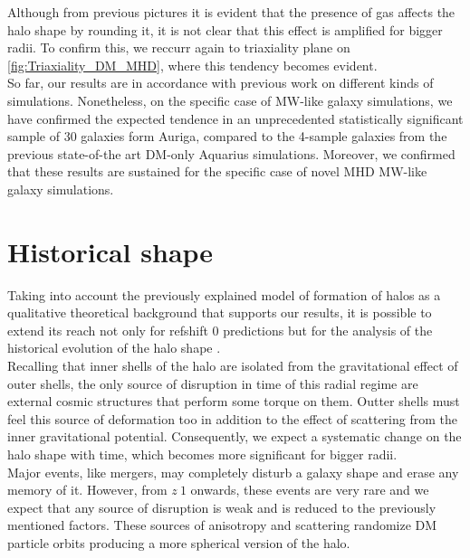 Although from previous pictures it is evident that the presence of gas affects the halo shape by rounding it, it is not clear that this effect is amplified for bigger radii. To confirm this, we reccurr again to triaxiality plane on \ref{fig:Triaxiality_DM_MHD}, where this tendency becomes evident.\\


So far, our results are in accordance with previous work on different kinds of simulations. Nonetheless, on the specific case of MW-like galaxy simulations, we have confirmed the expected tendence in an unprecedented statistically significant sample of 30 galaxies form Auriga, compared to the 4-sample galaxies from the previous state-of-the art DM-only Aquarius simulations. Moreover, we confirmed that these results are sustained for the specific case of novel MHD MW-like galaxy simulations.\\

\section{Historical shape}
Taking into account the previously explained model of formation of halos as a qualitative theoretical background that supports our results, it is possible to extend 
its reach not only for refshift 0 predictions but for the analysis of the historical evolution of the halo shape \cite{}.\\

 Recalling that inner shells of the halo are isolated from the gravitational effect of outer shells, the only source of disruption in time of this radial regime are external cosmic structures that perform some torque on them. Outter shells must feel this source of deformation too in addition to the effect of scattering from the inner gravitational potential. Consequently, we expect a systematic change on the halo shape with time, which becomes more significant for bigger radii.\\
 
Major events, like mergers, may completely disturb a galaxy shape and erase any memory of it. However, from $z~1$ onwards, these events are very rare \cite{} and we expect that any source of disruption is weak and is reduced to the previously mentioned factors. These sources of anisotropy and scattering randomize DM particle orbits producing a more spherical version of the halo. \cite{} \\  

